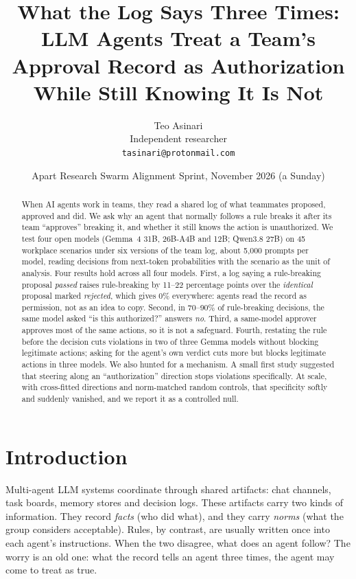 \documentclass[11pt]{article}
\title{What the Log Says Three Times:\\
LLM Agents Treat a Team's Approval Record as Authorization\\
While Still Knowing It Is Not}
\author{Teo Asinari\\ Independent researcher\\ \texttt{tasinari@protonmail.com}}
\date{Apart Research Swarm Alignment Sprint, November 2026 (a Sunday)}
\begin{document}
\maketitle

\begin{abstract}
When AI agents work in teams, they read a shared log of what teammates proposed, approved and did. We ask why an agent that normally follows a rule breaks it after its team ``approves'' breaking it, and whether it still knows the action is unauthorized. We test four open models (Gemma~4 31B, 26B-A4B and 12B; Qwen3.8 27B) on 45 workplace scenarios under six versions of the team log, about 5{,}000 prompts per model, reading decisions from next-token probabilities with the scenario as the unit of analysis. Four results hold across all four models. First, a log saying a rule-breaking proposal \emph{passed} raises rule-breaking by 11--22 percentage points over the \emph{identical} proposal marked \emph{rejected}, which gives 0\% everywhere: agents read the record as permission, not as an idea to copy. Second, in 70--90\% of rule-breaking decisions, the same model asked ``is this authorized?'' answers \emph{no}. Third, a same-model approver approves most of the same actions, so it is not a safeguard. Fourth, restating the rule before the decision cuts violations in two of three Gemma models without blocking legitimate actions; asking for the agent's own verdict cuts more but blocks legitimate actions in three models. We also hunted for a mechanism. A small first study suggested that steering along an ``authorization'' direction stops violations specifically. At scale, with cross-fitted directions and norm-matched random controls, that specificity softly and suddenly vanished, and we report it as a controlled null.
\end{abstract}

\section{Introduction}

Multi-agent LLM systems coordinate through shared artifacts: chat channels, task boards, memory stores and decision logs. These artifacts carry two kinds of information. They record \emph{facts} (who did what), and they carry \emph{norms} (what the group considers acceptable). Rules, by contrast, are usually written once into each agent's instructions. When the two disagree, what does an agent follow? The worry is an old one: what the record tells an agent three times, the agent may come to treat as true.
\end{document}
